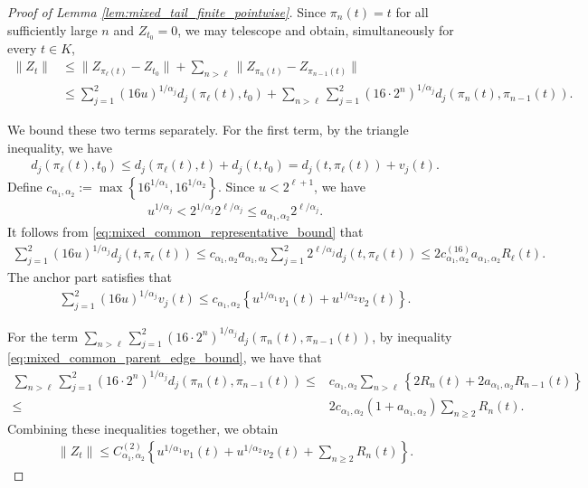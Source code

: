 \documentclass[10pt,a4paper]{amsart}
\newcommand{\cbr}[1]{\left\{#1\right\}}
\newcommand{\rbr}[1]{\left(#1\right)}
\begin{document}
\begin{proof}[Proof of Lemma
\ref{lem:mixed_tail_finite_pointwise}]
Since $\pi_n(t)=t$ for all sufficiently
large $n$ and $Z_{t_0}=0$, we may telescope and obtain, simultaneously
for every $t\in K$,
\begin{align*}
\|Z_t\|
&\le
\|Z_{\pi_\ell(t)}-Z_{t_0}\|
+
\sum_{n>\ell}
\|Z_{\pi_n(t)}-Z_{\pi_{n-1}(t)}\|\\
&\le
\sum_{j=1}^2
(16u)^{1/\alpha_j}
d_j(\pi_\ell(t),t_0)+
\sum_{n>\ell}
\sum_{j=1}^2
(16\cdot2^n)^{1/\alpha_j}
d_j(\pi_n(t),\pi_{n-1}(t)).
\end{align*}

We bound these two terms separately. For the first term, by the
triangle inequality, we have
\begin{align*}
d_j(\pi_\ell(t),t_0)\le
d_j(\pi_\ell(t),t)+d_j(t,t_0)=
d_j(t,\pi_\ell(t))+v_j(t).
\end{align*}
Define $c_{\alpha_1,\alpha_2}
:=
\max\cbr{16^{1/\alpha_1},16^{1/\alpha_2}}$. Since $u<2^{\ell+1}$, we have
\begin{align*}
u^{1/\alpha_j}
<
2^{1/\alpha_j}2^{\ell/\alpha_j}
\le
a_{\alpha_1,\alpha_2}2^{\ell/\alpha_j}.
\end{align*}
It follows from
\eqref{eq:mixed_common_representative_bound} that
\begin{align*}
\sum_{j=1}^2
(16u)^{1/\alpha_j}
d_j(t,\pi_\ell(t))\le
c_{\alpha_1,\alpha_2}
a_{\alpha_1,\alpha_2}
\sum_{j=1}^2
2^{\ell/\alpha_j}d_j(t,\pi_\ell(t))\le
2c_{\alpha_1,\alpha_2}^{(16)}
a_{\alpha_1,\alpha_2}R_\ell(t).
\end{align*}
The anchor part satisfies that
\begin{align*}\sum_{j=1}^2
(16u)^{1/\alpha_j}v_j(t)\le
c_{\alpha_1,\alpha_2}
\cbr{
u^{1/\alpha_1}v_1(t)
+
u^{1/\alpha_2}v_2(t)
}.
\end{align*}

For the term $\sum_{n>\ell}
\sum_{j=1}^2
(16\cdot2^n)^{1/\alpha_j}
d_j(\pi_n(t),\pi_{n-1}(t))$, by inequality
\eqref{eq:mixed_common_parent_edge_bound}, we have that
\begin{align*}
\sum_{n>\ell}
\sum_{j=1}^2
(16\cdot2^n)^{1/\alpha_j}
d_j(\pi_n(t),\pi_{n-1}(t))\le&
c_{\alpha_1,\alpha_2}
\sum_{n>\ell}
\cbr{
2R_n(t)
+
2a_{\alpha_1,\alpha_2}R_{n-1}(t)
}\\
\le&
2c_{\alpha_1,\alpha_2}
\rbr{1+a_{\alpha_1,\alpha_2}}
\sum_{n\ge2}R_n(t).
\end{align*}
Combining these inequalities together, we obtain
\begin{align}
\|Z_t\|
\le
C_{\alpha_1,\alpha_2}^{(2)}
\cbr{
u^{1/\alpha_1}v_1(t)
+
u^{1/\alpha_2}v_2(t)
+
\sum_{n\ge2}R_n(t)
}.
\label{eq:mixed_finite_pointwise_common_chain}
\end{align}


\end{proof}
\end{document}
